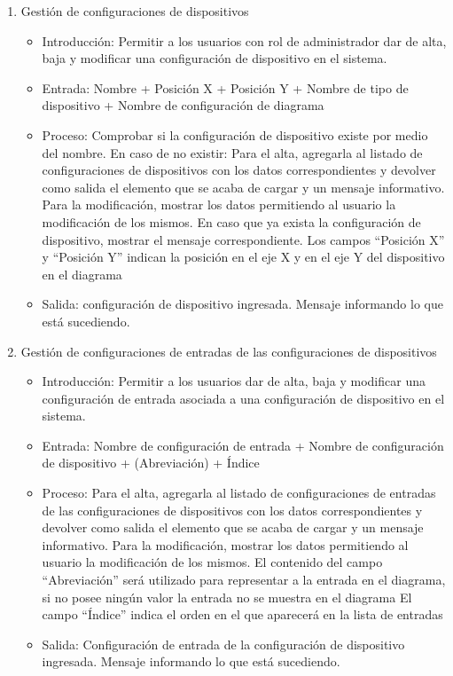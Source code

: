 \begin{enumerate}
			\item Gestión de configuraciones de dispositivos
				\begin{itemize}
					\item Introducción: Permitir a los usuarios con rol de administrador dar de alta, baja y modificar una configuración de dispositivo en el sistema.
					\item Entrada: Nombre + Posición X + Posición Y + Nombre de tipo de dispositivo + Nombre de configuración de diagrama
					\item Proceso: Comprobar si la configuración de dispositivo existe por medio del nombre. En caso de no existir:
					Para el alta, agregarla al listado de configuraciones de dispositivos con los datos correspondientes y devolver como salida el elemento que se acaba de cargar y un mensaje informativo.
					Para la modificación, mostrar los datos permitiendo al usuario la modificación de los mismos.
					En caso que ya exista la configuración de dispositivo, mostrar el mensaje correspondiente.
					Los campos ``Posición X'' y ``Posición Y'' indican la posición en el eje X y en el eje Y del dispositivo en el diagrama
					\item Salida: configuración de dispositivo ingresada. Mensaje informando lo que está sucediendo.
				\end{itemize}

			\item Gestión de configuraciones de entradas de las configuraciones de dispositivos
				\begin{itemize}
					\item Introducción: Permitir a los usuarios dar de alta, baja y modificar una configuración de entrada asociada a una configuración de dispositivo en el sistema.
					\item Entrada: Nombre de configuración de entrada + Nombre de configuración de dispositivo + (Abreviación) + Índice
					\item Proceso: Para el alta, agregarla al listado de configuraciones de entradas de las configuraciones de dispositivos con los datos correspondientes y devolver como salida el elemento que se acaba de cargar y un mensaje informativo.
					Para la modificación, mostrar los datos permitiendo al usuario la modificación de los mismos.
					El contenido del campo ``Abreviación'' será utilizado para representar a la entrada en el diagrama, si no posee ningún valor la entrada no se muestra en el diagrama 
					El campo ``Índice'' indica el orden en el que aparecerá en la lista de entradas
					\item Salida: Configuración de entrada de la configuración de dispositivo ingresada. Mensaje informando lo que está sucediendo.
				\end{itemize}
				

\end{enumerate}
